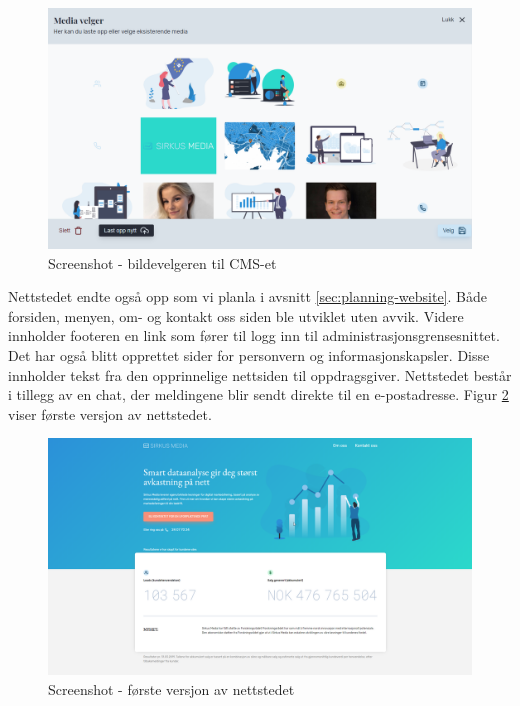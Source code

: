 \begin{figure}[H]
    \centering
    \includegraphics[width=\textwidth]{brukerveiledning/media-picker.png}
    \caption{Screenshot - bildevelgeren til CMS-et}
    \label{fig:media-picker-cms}
\end{figure}

Nettstedet endte også opp som vi planla i avsnitt \ref{sec:planning-website}. Både forsiden, menyen, om- og kontakt oss siden ble utviklet uten avvik. Videre innholder footeren en link som fører til logg inn til administrasjonsgrensesnittet. Det har også blitt opprettet sider for personvern og informasjonskapsler. Disse innholder tekst fra den opprinnelige nettsiden til oppdragsgiver. Nettstedet består i tillegg av en chat, der meldingene blir sendt direkte til en e-postadresse. Figur \ref{fig:first-version-website} viser første versjon av nettstedet.

\begin{figure}[H]
    \centering
    \includegraphics[width=\textwidth]{versjon-1-nettsted.png}
    \caption{Screenshot - første versjon av nettstedet}
    \label{fig:first-version-website}
\end{figure}


